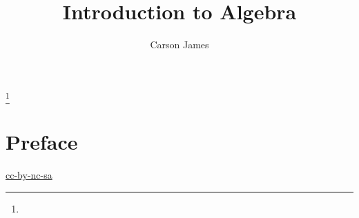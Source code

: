 \documentclass{book}
\begin{document}
	
	\frontmatter
	
	\title{Introduction to Algebra}
	
	
	\author{Carson James}
	\thanks{}
	
	\date{}
	
	\maketitle
	
	
	\setcounter{page}{4}
	
	\tableofcontents
	\printunsrtglossary[type=symbols,style=long,title={Notation}]
	
	
	\mainmatter
	
	\chapter*{Preface}
	
	\begin{flushleft}
		\href{https://creativecommons.org/licenses/by-nc-sa/4.0/legalcode.txt}{cc-by-nc-sa}
	\end{flushleft}
	
	\newpage
	
	
	
	
	
	
	
	
	
	
	
	
	
	
	
	
	
	
	
	
	
	
	
\end{document}
